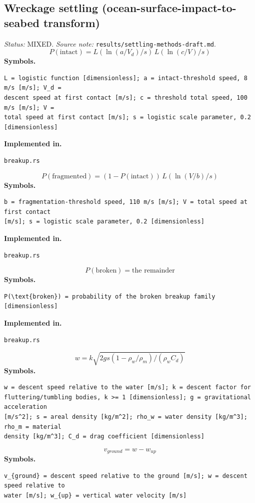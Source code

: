 \documentclass[11pt,a4paper]{article}
\begin{document}
\subsection{Wreckage settling (ocean-surface-impact-to-seabed transform)}
\noindent\textit{Status:} MIXED. \textit{Source note:} \texttt{results/settling-methods-draft.md}.
\medskip
\begin{equation}
P(\text{intact}) = L(\ln(a/V_d)/s)\, L(\ln(c/V)/s)
\end{equation}
\noindent\textbf{Symbols.}
\begin{verbatim}
L = logistic function [dimensionless]; a = intact-threshold speed, 8 m/s [m/s]; V_d =
descent speed at first contact [m/s]; c = threshold total speed, 100 m/s [m/s]; V =
total speed at first contact [m/s]; s = logistic scale parameter, 0.2 [dimensionless]
\end{verbatim}
\noindent\textbf{Implemented in.}
\begin{verbatim}
breakup.rs
\end{verbatim}
\medskip
\begin{equation}
P(\text{fragmented}) = (1 - P(\text{intact}))\, L(\ln(V/b)/s)
\end{equation}
\noindent\textbf{Symbols.}
\begin{verbatim}
b = fragmentation-threshold speed, 110 m/s [m/s]; V = total speed at first contact
[m/s]; s = logistic scale parameter, 0.2 [dimensionless]
\end{verbatim}
\noindent\textbf{Implemented in.}
\begin{verbatim}
breakup.rs
\end{verbatim}
\medskip
\begin{equation}
P(\text{broken}) = \text{the remainder}
\end{equation}
\noindent\textbf{Symbols.}
\begin{verbatim}
P(\text{broken}) = probability of the broken breakup family [dimensionless]
\end{verbatim}
\noindent\textbf{Implemented in.}
\begin{verbatim}
breakup.rs
\end{verbatim}
\medskip
\begin{equation}
w = k \sqrt{2 g s (1 - \rho_w/\rho_m) / (\rho_w C_d)}
\end{equation}
\noindent\textbf{Symbols.}
\begin{verbatim}
w = descent speed relative to the water [m/s]; k = descent factor for
fluttering/tumbling bodies, k >= 1 [dimensionless]; g = gravitational acceleration
[m/s^2]; s = areal density [kg/m^2]; rho_w = water density [kg/m^3]; rho_m = material
density [kg/m^3]; C_d = drag coefficient [dimensionless]
\end{verbatim}
\medskip
\begin{equation}
v_{ground} = w - w_{up}
\end{equation}
\noindent\textbf{Symbols.}
\begin{verbatim}
v_{ground} = descent speed relative to the ground [m/s]; w = descent speed relative to
water [m/s]; w_{up} = vertical water velocity [m/s]
\end{verbatim}
\medskip
\end{document}
